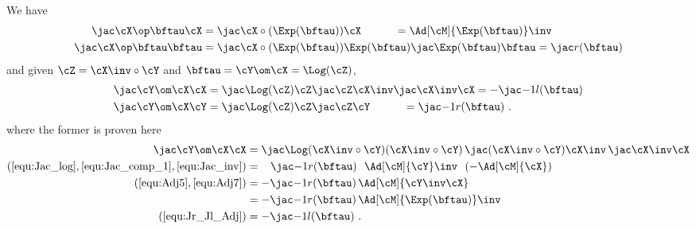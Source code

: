 We have
%
\begin{align}
\mjac{\cX\op\bftau}{\cX}
 &= \mjac{\cX\circ(\Exp(\bftau))}{\cX} 
 ~~~~~~~~~= \Ad[\cM]{\Exp(\bftau)}\inv \\
\mjac{\cX\op\bftau}{\bftau}
 &= \mjac{\cX\circ(\Exp(\bftau))}{\Exp(\bftau)}\mjac{\Exp(\bftau)}{\bftau}
 = \mjac{}{r}(\bftau) 
\end{align}
%
and given $\cZ=\cX\inv\circ\cY$ and $\bftau=\cY\om\cX=\Log(\cZ)$, 
%
\begin{align}
\mjac{\cY\om\cX}{\cX}
 &= \mjac{\Log(\cZ)}{\cZ}\mjac{\cZ}{\cX\inv}\mjac{\cX\inv}{\cX} 
  = -\mjac{-1}{l}(\bftau)
 \\
\mjac{\cY\om\cX}{\cY}
 &= \mjac{\Log(\cZ)}{\cZ}\mjac{\cZ}{\cY} 
 ~~~~~~~~~= \mjac{-1}{r}(\bftau)
~.
\end{align}
%
where the former is proven here
%
\begin{align*}
\mjac{\cY\om\cX}{\cX}
 &= \mjac{\Log(\cX\inv\circ\cY)}{(\cX\inv\circ\cY)}\,\mjac{(\cX\inv\circ\cY)}{\cX\inv}\,\mjac{\cX\inv}{\cX} 
 \notag\\ 
 (\ref{equ:Jac_log},\ref{equ:Jac_comp_1},\ref{equ:Jac_inv})
 &= ~~\,\mjac{-1}{r}(\bftau)~~\Ad[\cM]{\cY}\inv~~(-\Ad[\cM]{\cX}) 
 \notag\\ 
 (\ref{equ:Adj5},\ref{equ:Adj7})
 &= -\mjac{-1}{r}(\bftau)\,\Ad[\cM]{\cY\inv\cX} 
 \notag\\ 
 &= -\mjac{-1}{r}(\bftau)\,\Ad[\cM]{\Exp(\bftau)}\inv
 \notag\\
 (\ref{equ:Jr_Jl_Adj})
 &
 = -\mjac{-1}{l}(\bftau)
 ~.
\end{align*}




